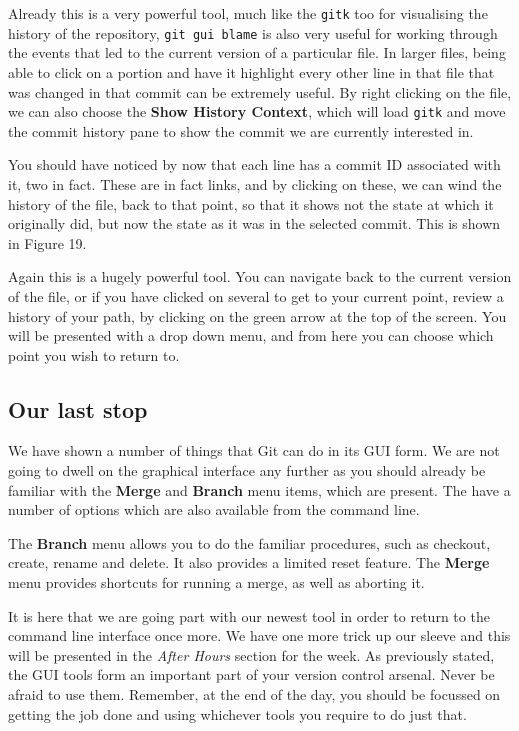Already this is a very powerful tool, much like the \texttt{gitk} too for visualising the history of the repository, \texttt{git gui blame} is also very useful for working through the events that led to the current version of a particular file.
In larger files, being able to click on a portion and have it highlight every other line in that file that was changed in that commit can be extremely useful.
By right clicking on the file, we can also choose the \textbf{Show History Context}, which will load \texttt{gitk} and move the commit history pane to show the commit we are currently interested in.


You should have noticed by now that each line has a commit ID associated with it, two in fact.
These are in fact links, and by clicking on these, we can wind the history of the file, back to that point, so that it shows not the state at which it originally did, but now the state as it was in the selected commit.
This is shown in Figure 19.


Again this is a hugely powerful tool.
You can navigate back to the current version of the file, or if you have clicked on several to get to your current point, review a history of your path, by clicking on the green arrow at the top of the screen.
You will be presented with a drop down menu, and from here you can choose which point you wish to return to.

\subsection{Our last stop}
We have shown a number of things that Git can do in its GUI form.
We are not going to dwell on the graphical interface any further as you should already be familiar with the \textbf{Merge} and \textbf{Branch} menu items, which are present.
The have a number of options which are also available from the command line.

The \textbf{Branch} menu allows you to do the familiar procedures, such as checkout, create, rename and delete.
It also provides a limited reset feature.
The \textbf{Merge} menu provides shortcuts for running a merge, as well as aborting it.

It is here that we are going part with our newest tool in order to return to the command line interface once more.
We have one more trick up our sleeve and this will be presented in the \emph{After Hours} section for the week.
As previously stated, the GUI tools form an important part of your version control arsenal.
Never be afraid to use them.
Remember, at the end of the day, you should be focussed on getting the job done and using whichever tools you require to do just that.

